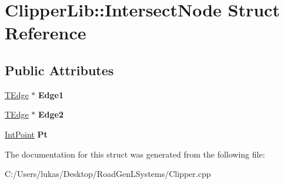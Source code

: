\hypertarget{struct_clipper_lib_1_1_intersect_node}{}\section{Clipper\+Lib\+:\+:Intersect\+Node Struct Reference}
\label{struct_clipper_lib_1_1_intersect_node}
\subsection*{Public Attributes}
\begin{DoxyCompactItemize}
\item 
\hypertarget{struct_clipper_lib_1_1_intersect_node_a43fd790cc38441edb594841d79b25f13}{}\label{struct_clipper_lib_1_1_intersect_node_a43fd790cc38441edb594841d79b25f13} 
\hyperlink{struct_clipper_lib_1_1_t_edge}{T\+Edge} $\ast$ {\bfseries Edge1}
\item 
\hypertarget{struct_clipper_lib_1_1_intersect_node_afcb56e7564fedf1c90962a9f75454539}{}\label{struct_clipper_lib_1_1_intersect_node_afcb56e7564fedf1c90962a9f75454539} 
\hyperlink{struct_clipper_lib_1_1_t_edge}{T\+Edge} $\ast$ {\bfseries Edge2}
\item 
\hypertarget{struct_clipper_lib_1_1_intersect_node_a91fc92370fb47797dae0602443e6475e}{}\label{struct_clipper_lib_1_1_intersect_node_a91fc92370fb47797dae0602443e6475e} 
\hyperlink{struct_clipper_lib_1_1_int_point}{Int\+Point} {\bfseries Pt}
\end{DoxyCompactItemize}


The documentation for this struct was generated from the following file\+:\begin{DoxyCompactItemize}
\item 
C\+:/\+Users/lukas/\+Desktop/\+Road\+Gen\+L\+Systems/Clipper.\+cpp\end{DoxyCompactItemize}
